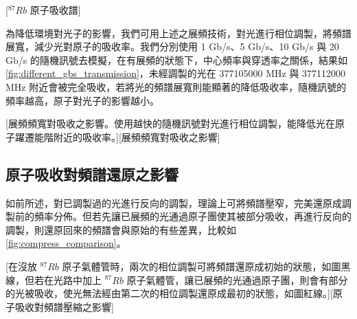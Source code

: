 \documentclass[class=NCU_thesis, crop=false]{standalone}
\begin{document}
[$^{87}Rb$ 原子吸收譜]

為降低環境對光子的影響，我們可用上述之展頻技術，對光進行相位調製，將頻譜展寬，減少光對原子的吸收率。我們分別使用 1 Gb/s、5 Gb/s、10 Gb/s 與 20 Gb/s 的隨機訊號去模擬，在有展頻的狀態下，中心頻率與穿透率之關係，結果如\cref{fig:different_gbs_transmission}，未經調製的光在 377105000 MHz 與 377112000 MHz 附近會被完全吸收，若將光的頻譜展寬則能顯著的降低吸收率，隨機訊號的頻率越高，原子對光子的影響越小。

[展頻頻寬對吸收之影響。使用越快的隨機訊號對光進行相位調製，能降低光在原子躍遷能階附近的吸收率。][展頻頻寬對吸收之影響]

\subsection{原子吸收對頻譜還原之影響}
如前所述，對已調製過的光進行反向的調製，理論上可將頻譜壓窄，完美還原成調製前的頻率分佈。但若先讓已展頻的光通過原子團使其被部分吸收，再進行反向的調製，則還原回來的頻譜會與原始的有些差異，比較如\cref{fig:compress_comparison}。

[在沒放 $^{87}Rb$ 原子氣體管時，兩次的相位調製可將頻譜還原成初始的狀態，如圖黑線，但若在光路中加上 $^{87}Rb$ 原子氣體管，讓已展頻的光通過原子團，則會有部分的光被吸收，使光無法經由第二次的相位調製還原成最初的狀態，如圖紅線。][原子吸收對頻譜壓縮之影響]
\end{document}
